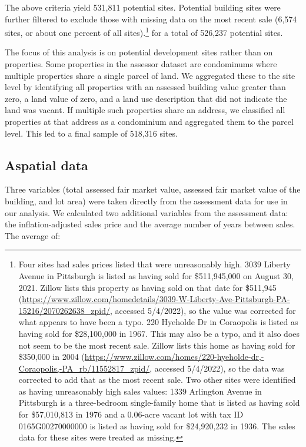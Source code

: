 \documentclass[
]{book}
\theoremstyle{definition}
\theoremstyle{definition}
\theoremstyle{definition}
\theoremstyle{definition}
\theoremstyle{remark}
\begin{document}
The above criteria yield 531,811 potential sites. Potential building sites were
further filtered to exclude those with missing data on the most recent sale
(6,574 sites, or about one percent of all sites).\footnote{Four sites had sales prices
  listed that were unreasonably high. 3039 Liberty Avenue in Pittsburgh is listed
  as having sold for \$511,945,000 on August 30, 2021. Zillow lists this property
  as having sold on that date for \$511,945
  (\url{https://www.zillow.com/homedetails/3039-W-Liberty-Ave-Pittsburgh-PA-15216/2070262638_zpid/}, accessed 5/4/2022),
  so the value was corrected for what appears to have been a typo. 220 Hyeholde Dr
  in Coraopolis is listed as having sold for \$28,100,000 in 1967. This may also
  be a typo, and it also does not seem to be the most recent sale. Zillow lists
  this home as having sold for \$350,000 in 2004
  (\url{https://www.zillow.com/homes/220-hyeholde-dr,-Coraopolis,-PA_rb/11552817_zpid/},
  accessed 5/4/2022), so the data was corrected to add that as the most recent sale.
  Two other sites were identified as having unreasonably high sales values: 1339
  Arlington Avenue in Pittsburgh is a three-bedroom single-family home that is
  listed as having sold for \$57,010,813 in 1976 and a 0.06-acre vacant lot with
  tax ID 0165G00270000000 is listed as having sold for \$24,920,232 in 1936. The
  sales data for these sites were treated as missing.} for a total of 526,237
potential sites.

The focus of this analysis is on potential development sites rather than on
properties. Some properties in the assessor dataset are condominums where
multiple properties share a single parcel of land. We aggregated these to the
site level by identifying all properties with an assessed building value
greater than zero, a land value of zero, and a land use description that did
not indicate the land was vacant. If multiple such properties share an address,
we classified all properties at that address as a condominium and aggregated
them to the parcel level. This led to a final sample of 518,316 sites.

\hypertarget{aspatial-data}{%
\subsection{Aspatial data}\label{aspatial-data}}

Three variables (total assessed fair market value, assessed fair market value of the building, and lot area) were taken directly from the assessment data for use in our analysis. We calculated two additional variables from the assessment data: the inflation-adjusted sales price and the average number of years between sales. The average of:
\end{document}
